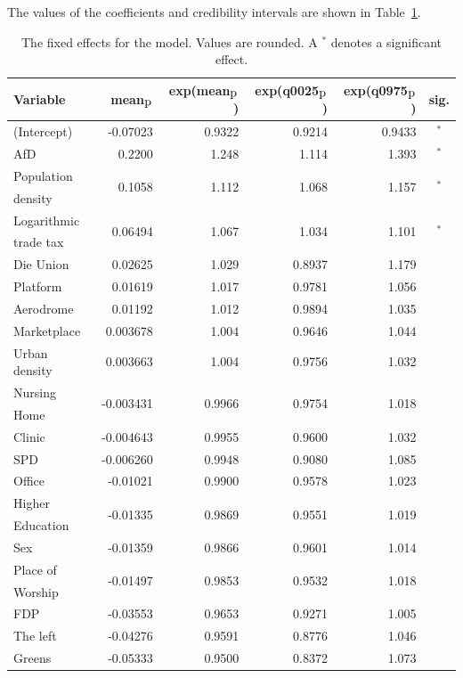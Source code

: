 The values of the coefficients and credibility intervals are shown in Table~\ref{FixedAllGermany_spatial}.
\begin{table}[H]
\caption{The fixed effects for the model. Values are rounded. A $^*$ denotes a significant effect. \label{FixedAllGermany_spatial}}
\begin{tabular}{l r r r r c}
\toprule
\textbf{Variable}	& \textbf{mean$_{\hbox{p}}$}	& \textbf{exp(mean$_{\hbox{p}}$)} & \textbf{exp(q0025$_{\hbox{p}}$)} & \textbf{exp(q0975$_{\hbox{p}}$)} & \textbf{sig.}\\
\midrule
(Intercept) & -0.07023 & 0.9322 & 0.9214 & 0.9433 & $^*$\\
AfD & 0.2200 & 1.248 & 1.114 & 1.393 & $^*$\\
Population & \multirow{2}{*}{0.1058} & \multirow{2}{*}{1.112} & \multirow{2}{*}{1.068} & \multirow{2}{*}{1.157} & \multirow{2}{*}{$^*$}\\
density \\
Logarithmic & \multirow{2}{*}{0.06494} & \multirow{2}{*}{1.067} & \multirow{2}{*}{1.034} & \multirow{2}{*}{1.101} & \multirow{2}{*}{$^*$}\\
trade tax \\
Die Union & 0.02625 & 1.029 & 0.8937 & 1.179\\
Platform & 0.01619 & 1.017 & 0.9781 & 1.056 \\
Aerodrome & 0.01192 & 1.012 & 0.9894 & 1.035 \\
Marketplace & 0.003678 & 1.004 & 0.9646 & 1.044 \\
Urban density & 0.003663 & 1.004 & 0.9756 & 1.032 \\
Nursing& \multirow{2}{*}{-0.003431} & \multirow{2}{*}{0.9966} & \multirow{2}{*}{0.9754} & \multirow{2}{*}{1.018} \\
Home\\
Clinic & -0.004643 & 0.9955 & 0.9600 & 1.032 \\
SPD & -0.006260 & 0.9948 & 0.9080 & 1.085\\
Office & -0.01021 & 0.9900 & 0.9578 & 1.023 \\
Higher & \multirow{2}{*}{-0.01335} & \multirow{2}{*}{0.9869} & \multirow{2}{*}{0.9551} & \multirow{2}{*}{1.019} \\
Education\\
Sex & -0.01359 & 0.9866 & 0.9601 & 1.014 & \\
Place of & \multirow{2}{*}{-0.01497} & \multirow{2}{*}{0.9853} & \multirow{2}{*}{0.9532} & \multirow{2}{*}{1.018} \\
Worship\\
FDP & -0.03553 & 0.9653 & 0.9271& 1.005 \\
The left & -0.04276 & 0.9591 & 0.8776 & 1.046\\
Greens & -0.05333 & 0.9500 & 0.8372 & 1.073 \\
\bottomrule
\end{tabular}
\end{table}
